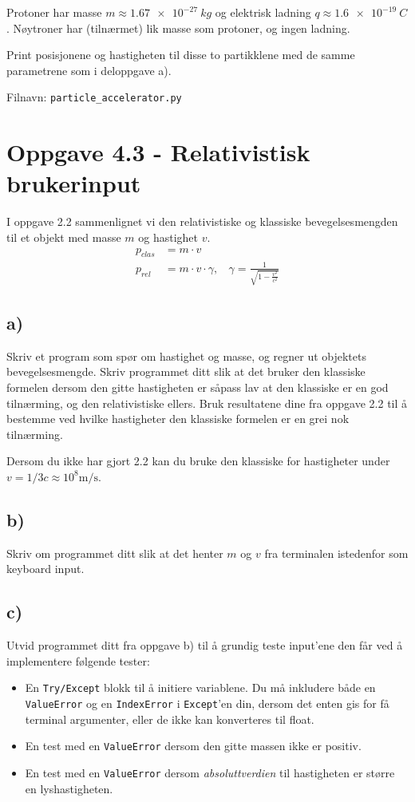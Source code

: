 \documentclass[10pt,a4paper]{article}
\begin{document}
Protoner har masse $m \approx \SI{1.67e-27}{kg}$ og elektrisk ladning $q \approx \SI{1.6e-19}{C}$. Nøytroner har (tilnærmet) lik masse som protoner, og ingen ladning.
 
Print posisjonene og hastigheten til disse to partikklene med de samme parametrene som i deloppgave a).
 
Filnavn: \texttt{particle\_accelerator.py}
 
 
 
 
\section*{Oppgave 4.3 - Relativistisk brukerinput}

I oppgave 2.2 sammenlignet vi den relativistiske og klassiske bevegelsesmengden til et objekt med masse $m$ og hastighet $v$.
\begin{align*}
p_{clas} &= m\cdot v
\\
p_{rel} &= m\cdot v\cdot \gamma, \ \ \ \ \gamma = \frac{1}{\sqrt{1-\frac{v^2}{c^2}}}
\end{align*}
 
\subsection*{a)}
Skriv et program som spør om hastighet og masse, og regner ut objektets bevegelsesmengde. Skriv programmet ditt slik at det bruker den klassiske formelen dersom den gitte hastigheten er såpass lav at den klassiske er en god tilnærming, og den relativistiske ellers. Bruk resultatene dine fra oppgave 2.2 til å bestemme ved hvilke hastigheter den klassiske formelen er en grei nok tilnærming.
 
Dersom du ikke har gjort 2.2 kan du bruke den klassiske for hastigheter under $v = 1/3c \approx 10^8\mathrm{m/s}$.
 
 
\subsection*{b)}
Skriv om programmet ditt slik at det henter $m$ og $v$ fra terminalen istedenfor som keyboard input.
 
 
\subsection*{c)}
Utvid programmet ditt fra oppgave b) til å grundig teste input'ene den får ved å implementere følgende tester:
\begin{itemize}
\item En \texttt{Try/Except} blokk til å initiere variablene. Du må inkludere både en \texttt{ValueError} og en \texttt{IndexError} i \texttt{Except}'en din, dersom det enten gis for få terminal argumenter, eller de ikke kan konverteres til float.
\item En test med en \texttt{ValueError} dersom den gitte massen ikke er positiv.
\item En test med en \texttt{ValueError} dersom \textit{absoluttverdien} til hastigheten er større en lyshastigheten.
\end{itemize}
 
\end{document}
